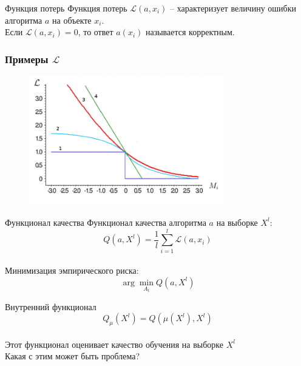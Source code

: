 \documentclass[10pt]{beamer}
\begin{document}
{
\begin{frame}{Функция потерь}
  Функция потерь $\mathcal{L}(a, x_i) $ -- характеризует величину ошибки алгоритма $a$ на объекте $x_i$.\\
  \bigbreak
  Если $\mathcal{L} (a, x_i) = 0$, то ответ $a(x_i)$ называется корректным.
\end{frame}
}

{
\begin{frame}\frametitle{Примеры $\mathcal{L}$}
	\begin{figure}[htbp]
	  \includegraphics[height=160pt, keepaspectratio = true]{images/l}
	\end{figure}
\end{frame}
}

{
\begin{frame}{Функционал качества}
  Функционал качества алгоритма $a$ на выборке $X^l$:\\
  $$Q(a, X^l) = \frac{1}{l} \sum\limits_{i=1}^l \mathcal{L}(a, x_i)$$\\
  Минимизация эмпирического риска:\\
  $$\arg\min\limits_{A_t} Q(a, X^l)$$
\end{frame}
}

\begin{frame}{Внутренний функционал}  
  $$Q_{\mu}(X^l) = Q(\mu(X^l), X^l)$$\\
  \bigbreak
  Этот функционал оценивает качество обучения на выборке $X^l$\\
  \bigbreak
  \pause
  Какая с этим может быть проблема?
\end{frame}

%
\end{document}
